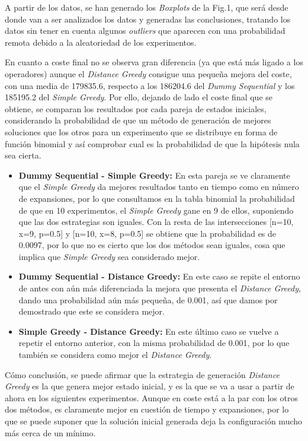 \documentclass{article}
\begin{document}
\begin{enumerate}
  A partir de los datos, se han generado los \textit{Boxplots} de la Fig.1, que será desde donde van a ser analizados los datos y generadas las conclusiones, tratando los datos sin tener en cuenta algunos \textit{outliers} que aparecen con una probabilidad remota debido a la aleatoriedad de los experimentos.\par
  En cuanto a coste final no se observa gran diferencia (ya que está más ligado a los operadores) aunque el \textit{Distance Greedy} consigue una pequeña mejora del coste, con una media de 179835.6, respecto a los 186204.6 del \textit{Dummy Sequential} y los 185195.2 del \textit{Simple Greedy}. Por ello, dejando de lado el coste final que se obtiene, se comparan los resultados por cada pareja de estados iniciales, considerando la probabilidad de que un método de generación de mejores soluciones que los otros para un experimento que se distribuye en forma de función binomial y así comprobar cual es la probabilidad de que la hipótesis nula sea cierta.

  \begin{itemize}
    \item \textbf{Dummy Sequential - Simple Greedy:} En esta pareja se ve claramente que el \textit{Simple Greedy} da mejores resultados tanto en tiempo como en número de expansiones, por lo que consultamos en la tabla binomial la probabilidad de que en 10 experimentos, el \textit{Simple Greedy} gane en 9 de ellos, suponiendo que las dos estrategias son iguales. Con la resta de las intersecciones [n=10, x=9, p=0.5] y [n=10, x=8, p=0.5] se obtiene que la probabilidad es de 0.0097, por lo que no es cierto que los dos métodos sean iguales, cosa que implica que \textit{Simple Greedy} sea considerado mejor.
    \item \textbf{Dummy Sequential - Distance Greedy:} En este caso se repite el entorno de antes con aún más diferenciada la mejora que presenta el \textit{Distance Greedy}, dando una probabilidad aún más pequeña, de 0.001, así que damos por demostrado que este se considera mejor.
    \item \textbf{Simple Greedy - Distance Greedy:} En este último caso se vuelve a repetir el entorno anterior, con la misma probabilidad de 0.001, por lo que también se considera como mejor el \textit{Distance Greedy}.
  \end{itemize}

  Cómo conclusión, se puede afirmar que la estrategia de generación \textit{Distance Greedy} es la que genera mejor estado inicial, y es la que se va a usar a partir de ahora en los siguientes experimentos. Aunque en coste está a la par con los otros dos métodos, es claramente mejor en cuestión de tiempo y expansiones, por lo que se puede suponer que la solución inicial generada deja la configuración mucho más cerca de un mínimo.


\end{enumerate}
\end{document}
